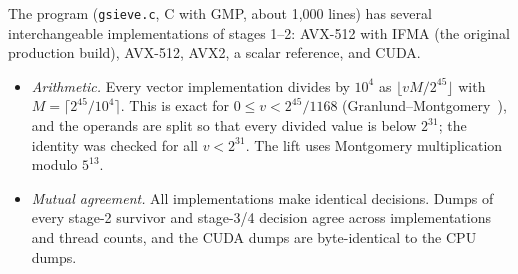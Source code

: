 \documentclass[11pt]{article}
\theoremstyle{definition}
\begin{document}
The program (\texttt{gsieve.c}, C with GMP, about 1,000 lines) has several interchangeable implementations of stages
1--2: AVX-512 with IFMA (the original production build), AVX-512, AVX2, a scalar reference, and CUDA.
\begin{itemize}
\item \emph{Arithmetic.} Every vector implementation divides by $10^4$ as $\lfloor vM/2^{45}\rfloor$ with
  $M=\lceil2^{45}/10^4\rceil$. This is exact for $0\le v<2^{45}/1168$ (Granlund--Montgomery~\cite{gm}), and the operands
  are split so that every divided value is below $2^{31}$; the identity was checked for all $v<2^{31}$. The lift uses
  Montgomery multiplication~\cite{montgomery} modulo $5^{13}$.
\item \emph{Mutual agreement.} All implementations make identical decisions. Dumps of every stage-2 survivor and
  stage-3/4 decision agree across implementations and thread counts, and the CUDA dumps are byte-identical to the CPU
  dumps.
\end{itemize}
\end{document}
